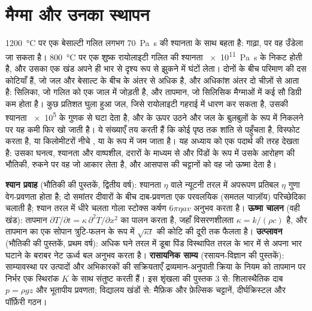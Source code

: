 \chapter{मैग्मा और उनका स्थापन}\label{ch:b2:magma-emplacement}

\qty{1200}{\celsius} पर एक बेसाल्टी गलित लगभग \qty{70}{Pa.s} की श्यानता के साथ बहता है:
गाढ़ा, पर वह उँडेला जा सकता है। \qty{800}{\celsius} पर एक शुष्क रायोलाइटी गलित
की श्यानता \qty{e11}{Pa.s} के निकट होती है, और उसका एक खंड अपने ही भार से दृश्य रूप से
झुकने में घंटों लेता। दोनों के बीच परिमाण की दस कोटियाँ हैं, जो
जल और बेसाल्ट के बीच के अंतर से अधिक है, और अधिकांश अंतर दो
चीज़ों से आता है: सिलिका, जो गलित को एक जाल में जोड़ती है, और तापमान,
जो सिलिसिक मैग्माओं में कई सौ डिग्री कम होता है। कुछ प्रतिशत
घुला हुआ जल, जिसे रायोलाइटी  गहराई में धारण कर सकता है, उसकी श्यानता
\num{e5} के गुणक से घटा देता है, और  के ऊपर उठने और जल के
बुलबुलों के रूप में निकलने पर यह कमी फिर खो जाती है। ये संख्याएँ तय करती हैं कि कोई 
पृष्ठ तक शांति से पहुँचता है, विस्फोट करता है, या किलोमीटरों नीचे ,  या
 के रूप में जम जाता है। यह अध्याय  को एक पदार्थ की तरह देखता है: उसका घनत्व, श्यानता और
वाष्पशील, दरारों के माध्यम से और पिंडों के रूप में उसके आरोहण की भौतिकी, रुकने पर वह जो आकार
लेता है, और आसपास की चट्टानों को वह जो ऊष्मा देता है।

\begin{recall}
\textbf{श्यान प्रवाह} (भौतिकी की पुस्तकें, द्वितीय वर्ष): श्यानता $\eta$ वाले
न्यूटनी तरल में अपरूपण प्रतिबल $\eta$ गुणा वेग-प्रवणता होता है;
दो समांतर दीवारों के बीच दाब-प्रवणता एक परवलयिक (समतल प्वाज़ॉय)
परिच्छेदिका चलाती है; श्यान तरल में धीरे चलता गोला स्टोक्स कर्षण
$6\pi\eta a v$ अनुभव करता है। \textbf{ऊष्मा चालन} (वही खंड): तापमान
$\partial T/\partial t = \kappa\,\partial^2T/\partial x^2$ का पालन करता है, जहाँ विसरणशीलता $\kappa = k/(\rho
c)$ है, और तापमान का एक सोपान त्रुटि-फलन के रूप में
$\sqrt{\kappa t}$ की कोटि की दूरी तक फैलता है। \textbf{उत्प्लावन} (भौतिकी की पुस्तकें, प्रथम वर्ष): अधिक घने तरल में
डूबा पिंड विस्थापित तरल के भार में से अपना भार घटाने के बराबर
नेट ऊर्ध्व बल अनुभव करता है। \textbf{रासायनिक साम्य} (रसायन-विज्ञान की पुस्तकें): साम्यावस्था पर
उत्पादों और अभिकारकों की सक्रियताएँ द्रव्यमान-अनुपाती क्रिया के नियम को
तापमान पर निर्भर एक स्थिरांक $K$ के साथ संतुष्ट करती हैं। इस शृंखला की पुस्तक 3 से:
शिलास्थैतिक दाब $p = \rho g z$ और भूतापीय प्रवणता; विद्यालय
खंडों से: मैफ़िक और फ़ेल्सिक चट्टानें, दीर्घक्रिस्टल और पॉर्फ़िरी गठन।
\end{recall}

